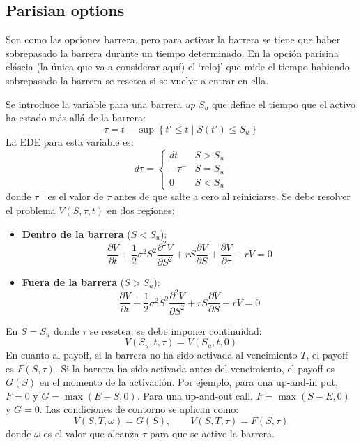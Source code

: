 \subsection{Parisian options}
Son como las opciones barrera, pero para activar la barrera se tiene que haber sobrepasado la barrera durante un tiempo determinado. En la opción parisina cláscia (la única que va a considerar aquí) el `reloj' que mide el tiempo habiendo sobrepasado la barrera se resetea si se vuelve a entrar en ella.

Se introduce la variable para una barrera \textit{up} $S_u$ que define el tiempo que el activo ha estado más allá de la barrera:
\begin{equation*}
    \tau = t - \sup \left\{ t' \leq t \mid S(t') \leq S_u \right\}
\end{equation*}
La EDE para esta variable es:
\begin{equation*}
    d\tau = 
    \begin{cases}
        dt & S > S_u \\
        -\tau^- & S = S_u \\
        0 & S < S_u
    \end{cases}
\end{equation*}
donde $\tau^-$ es el valor de $\tau$ antes de que salte a cero al reiniciarse. Se debe resolver el problema $V(S, \tau, t)$ en dos regiones:
\begin{itemize}
    \item \textbf{Dentro de la barrera} ($S < S_u$): 
    \begin{equation*}
        \boxed{\frac{\partial V}{\partial t} + \frac{1}{2} \sigma^2 S^2 \frac{\partial^2 V}{\partial S^2} + r S \frac{\partial V}{\partial S} + \frac{\partial V}{\partial \tau} - r V = 0}
    \end{equation*}

    \item \textbf{Fuera de la barrera} ($S > S_u$):
    \begin{equation*}
        \boxed{\frac{\partial V}{\partial t} + \frac{1}{2} \sigma^2 S^2 \frac{\partial^2 V}{\partial S^2} + r S \frac{\partial V}{\partial S} - r V = 0}
    \end{equation*}
\end{itemize}
En $S=S_u$ donde $\tau$ se resetea, se debe imponer continuidad:
\begin{equation*}
    \boxed{V(S_u, t, \tau) = V(S_u, t, 0)}
\end{equation*}
En cuanto al payoff, si la barrera no ha sido activada al vencimiento $T$, el payoff es $F(S, \tau)$. Si la barrera ha sido activada antes del vencimiento, el payoff es $G(S)$ en el momento de la activación. Por ejemplo, para una up-and-in put, $F = 0$ y $G = \max(E - S, 0)$. Para una up-and-out call, $F = \max(S - E, 0)$ y $G = 0$. Las condiciones de contorno se aplican como:
\begin{equation*}
    \boxed{V(S, T, \omega) = G(S), \qquad V(S, T, \tau) = F(S, \tau)}
\end{equation*}
donde $\omega$ es el valor que alcanza $\tau$ para que se active la barrera.

